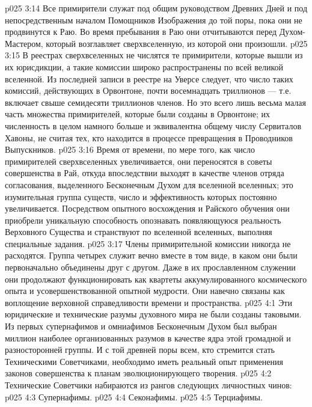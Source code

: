 \vs p025 3:14 \pc Все примирители служат под общим руководством Древних Дней и под непосредственным началом Помощников Изображения до той поры, пока они не продвинутся к Раю. Во время пребывания в Раю они отчитываются перед Духом\hyp{}Мастером, который возглавляет сверхвселенную, из которой они произошли.
\vs p025 3:15 В реестрах сверхвселенных не числятся те примирители, которые вышли из их юрисдикции, а такие комиссии широко распространены по всей великой вселенной. Из последней записи в реестре на Уверсе следует, что число таких комиссий, действующих в Орвонтоне, почти восемнадцать триллионов --- т.е. включает свыше семидесяти триллионов членов. Но это всего лишь весьма малая часть множества примирителей, которые были созданы в Орвонтоне; их численность в целом намного больше и эквивалентна общему числу Сервиталов Хавоны, не считая тех, кто находится в процессе превращения в Проводников Выпускников.
\vs p025 3:16 Время от времени, по мере того, как число примирителей сверхвселенных увеличивается, они переносятся в советы совершенства в Рай, откуда впоследствии выходят в качестве членов отряда согласования, выделенного Бесконечным Духом для вселенной вселенных; это изумительная группа существ, число и эффективность которых постоянно увеличивается. Посредством опытного восхождения и Райского обучения они приобрели уникальную способность опознавать появляющуюся реальность Верховного Существа и странствуют по вселенной вселенных, выполняя специальные задания.
\vs p025 3:17 Члены примирительной комиссии никогда не расходятся. Группа четырех служит вечно вместе в том виде, в каком они были первоначально объединены друг с другом. Даже в их прославленном служении они продолжают функционировать как квартеты аккумулированного космического опыта и усовершенствованной опытной мудрости. Они навечно связаны как воплощение верховной справедливости времени и пространства.
\vs p025 4:1 Эти юридические и технические разумы духовного мира не были созданы таковыми. Из первых супернафимов и омниафимов Бесконечным Духом был выбран миллион наиболее организованных разумов в качестве ядра этой громадной и разносторонней группы. И с той древней поры всем, кто стремится стать Техническими Советчиками, необходимо иметь реальный опыт применения законов совершенства к планам эволюционирующего творения.
\vs p025 4:2 \pc Технические Советчики набираются из рангов следующих личностных чинов:
\vs p025 4:3 \bibnobreakspace Супернафимы.
\vs p025 4:4 \bibnobreakspace Секонафимы.
\vs p025 4:5 \bibnobreakspace Терциафимы.
